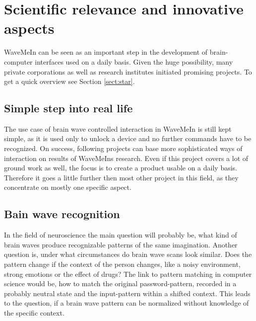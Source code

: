 \section{Scientific relevance and innovative aspects}
\label{sect:relevance}

WaveMeIn can be seen as an important step in the development of brain-computer interfaces used on a daily basis. Given the huge possibility, many private corporations as well as research institutes initiated promising projects. To get a quick overview see Section \ref{sect:star}.

\subsection{Simple step into real life}
The use case of brain wave controlled interaction in WaveMeIn is still kept simple, as it is used only to unlock a device and no further commands have to be recognized. On success, following projects can base more sophisticated ways of interaction on results of WaveMeIns research. Even if this project covers a lot of ground work as well, the focus is to create a product usable on a daily basis. Therefore it goes a little further then most other project in this field, as they concentrate on mostly one specific aspect.

\subsection{Bain wave recognition}
In the field of neuroscience the main question will probably be, what kind of brain waves produce recognizable patterns of the same imagination. Another question is, under what circumstances do brain wave scans look similar. Does the pattern change if the context of the person changes, like a noisy environment, strong emotions or the effect of drugs?
The link to pattern matching in computer science would be, how to match the original password-pattern, recorded in a probably neutral state and the input-pattern within a shifted context. This leads to the question, if a brain wave pattern can be normalized without knowledge of the specific context.


